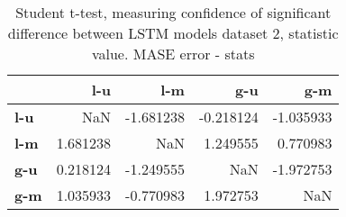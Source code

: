 \begin{table}[h]
\centering
\caption{Student t-test, measuring confidence of significant difference between LSTM models dataset 2, statistic value. MASE error - stats}
\label{table:ttest-stats-lstm-experiments-MASE-dataset-2}
\begin{tabular}{lrrrr}
\toprule
{} &       l-u &       l-m &       g-u &       g-m \\
\midrule
\textbf{l-u} &       NaN & -1.681238 & -0.218124 & -1.035933 \\
\textbf{l-m} &  1.681238 &       NaN &  1.249555 &  0.770983 \\
\textbf{g-u} &  0.218124 & -1.249555 &       NaN & -1.972753 \\
\textbf{g-m} &  1.035933 & -0.770983 &  1.972753 &       NaN \\
\bottomrule
\end{tabular}
\end{table}
